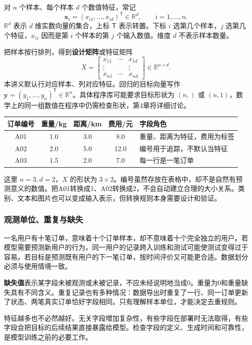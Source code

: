 \documentclass[UTF8,fontset=none,zihao=-4,a4paper]{ctexart}
\newcommand{\term}[1]{\textbf{#1}}
\numberwithin{equation}{section}
\numberwithin{figure}{section}
\begin{document}
对 $n$ 个样本、每个样本 $d$ 个数值特征，常记
\[
 \symbf{x}_i=(x_{i1},\ldots,x_{id})^{\mathsf T}\in\mathbb{R}^d,
 \qquad i=1,\ldots,n.
\]
$\mathbb{R}^d$ 表示 $d$ 维实数向量的集合，上标 $\mathsf T$ 表示转置。下标 $i$ 选第几个样本，$j$ 选第几个特征，$x_{ij}$ 因而是第 $i$ 个样本的第 $j$ 个输入数值。维度 $d$ 不表示样本数量。

把样本按行排列，得到\term{设计矩阵}或特征矩阵
\[
 X=\begin{bmatrix}
 x_{11}&\cdots&x_{1d}\\
 \vdots&&\vdots\\
 x_{n1}&\cdots&x_{nd}
 \end{bmatrix}\in\mathbb{R}^{n\times d}.
\]
本讲义默认行对应样本、列对应特征。回归的目标向量写作 $\symbf{y}=(y_1,\ldots,y_n)^{\mathsf T}\in\mathbb{R}^n$。具体程序库可能要求目标形状为 $(n,)$ 或 $(n,1)$，数学上的同一组数值在程序中仍需检查形状，第4章将详细讨论。

\begin{center}
\begin{tabularx}{\linewidth}{c c c c Y}
\toprule
订单编号 & 重量/kg & 距离/km & 费用/元 & 字段角色\\\midrule
A01 & 1.0 & 3.0 & 8.0 & 重量、距离为特征，费用为标签\\
A02 & 2.0 & 5.0 & 12.0 & 编号用于追踪，不默认当特征\\
A03 & 1.5 & 2.0 & 7.0 & 每一行是一笔订单\\
\bottomrule
\end{tabularx}
\end{center}
这里 $n=3,d=2$，$X$ 的形状为 $3\times2$。编号虽然存放在表格中，却不是自然有预测意义的数值。把A01转换成1、A02转换成2，不会自动建立合理的大小关系。类别、文本和图片也可以变成输入表示，但转换规则本身需要设计和验证。

\subsubsection{观测单位、重复与缺失}
一名用户有十笔订单，意味着十个订单样本，却不意味着十个完全独立的用户。若模型需要预测新用户的行为，同一用户的记录跨入训练和测试可能使测试变得过于容易。若目标是预测既有用户的下一笔订单，按时间评价又可能更合适。数据划分必须与使用情境一致。

\term{缺失值}表示某字段未被观测或未被记录，不应未经说明地当成0。重量为0和重量缺失具有不同含义。重复记录也有多种情况：数据导出时重复了一行、同一订单更新了状态、两笔真实订单恰好字段相同。只有理解样本单位，才能决定去重规则。

特征越多也不必然越好。无关字段增加复杂性，有些字段在部署时无法取得，有些字段会把目标的后续结果直接暴露给模型。检查字段的定义、生成时间和可靠性，是模型训练之前的必要工作。
\end{document}
